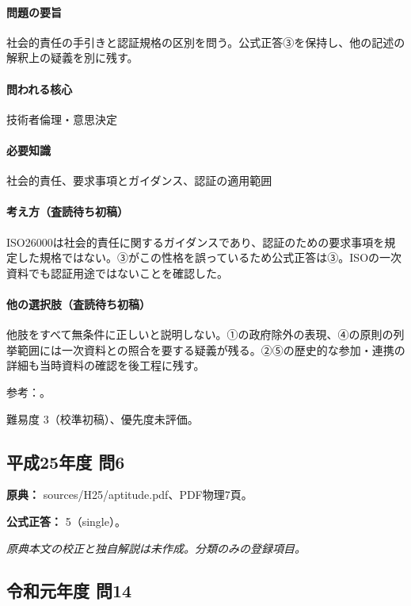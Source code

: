 \paragraph{問題の要旨} 社会的責任の手引きと認証規格の区別を問う。公式正答③を保持し、他の記述の解釈上の疑義を別に残す。

\paragraph{問われる核心} 技術者倫理・意思決定

\paragraph{必要知識} 社会的責任、要求事項とガイダンス、認証の適用範囲

\paragraph{考え方（査読待ち初稿）} ISO26000は社会的責任に関するガイダンスであり、認証のための要求事項を規定した規格ではない。③がこの性格を誤っているため公式正答は③。ISOの一次資料でも認証用途ではないことを確認した。

\paragraph{他の選択肢（査読待ち初稿）} 他肢をすべて無条件に正しいと説明しない。①の政府除外の表現、④の原則の列挙範囲には一次資料との照合を要する疑義が残る。②⑤の歴史的な参加・連携の詳細も当時資料の確認を後工程に残す。

\par 参考：\cite{iso26000}。

\par 難易度 3（校準初稿）、優先度未評価。

\subsection{平成25年度 問6}
\label{q:h25-reg-apt-06}

\noindent\textbf{原典：} sources/H25/aptitude.pdf、PDF物理7頁。

\textbf{公式正答：} 5（single）。

\par\textit{原典本文の校正と独自解説は未作成。分類のみの登録項目。}

\subsection{令和元年度 問14}
\label{q:r01-reg-apt-14}

